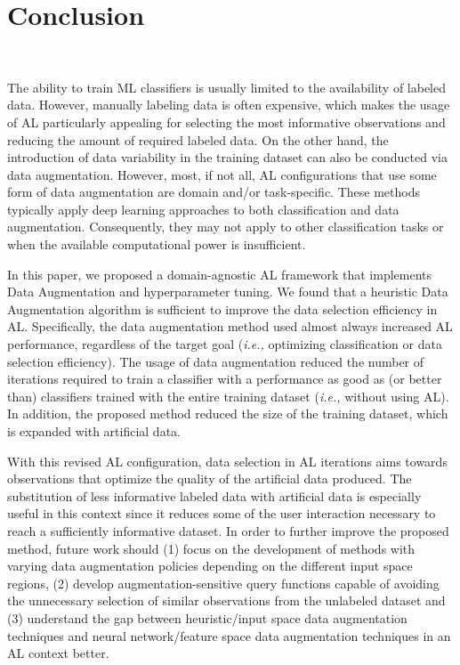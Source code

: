 \documentclass[parskip=full]{scrartcl}
\begin{document}
\section{Conclusion}~\label{sec:conclusion}

The ability to train ML classifiers is usually limited to the availability of
labeled data. However, manually labeling data is often expensive, which makes
the usage of AL particularly appealing for selecting the most informative
observations and reducing the amount of required labeled data. On the other
hand, the introduction of data variability in the training dataset can also be
conducted via data augmentation. However, most, if not all, AL configurations
that use some form of data augmentation are domain and/or task-specific. These
methods typically apply deep learning approaches to both classification and
data augmentation. Consequently, they may not apply to other classification
tasks or when the available computational power is insufficient.

In this paper, we proposed a domain-agnostic AL framework that implements Data
Augmentation and hyperparameter tuning. We found that a heuristic Data
Augmentation algorithm is sufficient to improve the data selection efficiency
in AL\@. Specifically, the data augmentation method used almost always
increased AL performance, regardless of the target goal (\textit{i.e.,}
optimizing classification or data selection efficiency). The usage of data
augmentation reduced the number of iterations required to train a classifier
with a performance as good as (or better than) classifiers trained with the
entire training dataset (\textit{i.e.,} without using AL). In addition, the
proposed method reduced the size of the training dataset, which is expanded
with artificial data. 

With this revised AL configuration, data selection in AL iterations aims
towards observations that optimize the quality of the artificial data
produced. The substitution of less informative labeled data with artificial
data is especially useful in this context since it reduces some of the user
interaction necessary to reach a sufficiently informative dataset. In order
to further improve the proposed method, future work should (1) focus on the
development of methods with varying data augmentation policies depending on
the different input space regions, (2) develop augmentation-sensitive query
functions capable of avoiding the unnecessary selection of similar
observations from the unlabeled dataset and (3) understand the gap between
heuristic/input space data augmentation techniques and neural network/feature
space data augmentation techniques in an AL context better.
\end{document}
